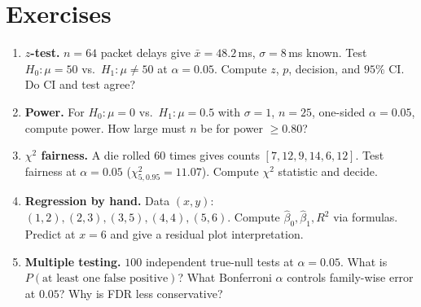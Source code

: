 \section{Exercises}
\label{sec:ch08-exercises}
\begin{enumerate}[label=E8.\arabic*, leftmargin=*, itemsep=0.8em]
\item \textbf{$z$-test.} $n=64$ packet delays give $\bar x=48.2\,$ms, $\sigma=8\,$ms known. Test $H_0:\mu=50$ vs.\ $H_1:\mu\ne50$ at $\alpha=0.05$. Compute $z$, $p$, decision, and $95\%$ CI. Do CI and test agree?
\item \textbf{Power.} For $H_0:\mu=0$ vs.\ $H_1:\mu=0.5$ with $\sigma=1$, $n=25$, one-sided $\alpha=0.05$, compute power. How large must $n$ be for power $\ge0.80$?
\item \textbf{$\chi^2$ fairness.} A die rolled $60$ times gives counts $[7,12,9,14,6,12]$. Test fairness at $\alpha=0.05$ ($\chi^2_{5,0.95}=11.07$). Compute $\chi^2$ statistic and decide.
\item \textbf{Regression by hand.} Data $(x,y)$: $(1,2),(2,3),(3,5),(4,4),(5,6)$. Compute $\hat\beta_0,\hat\beta_1,R^2$ via formulas. Predict at $x=6$ and give a residual plot interpretation.
\item \textbf{Multiple testing.} $100$ independent true-null tests at $\alpha=0.05$. What is $P(\text{at least one false positive})$? What Bonferroni $\alpha$ controls family-wise error at $0.05$? Why is FDR less conservative?
\end{enumerate}
